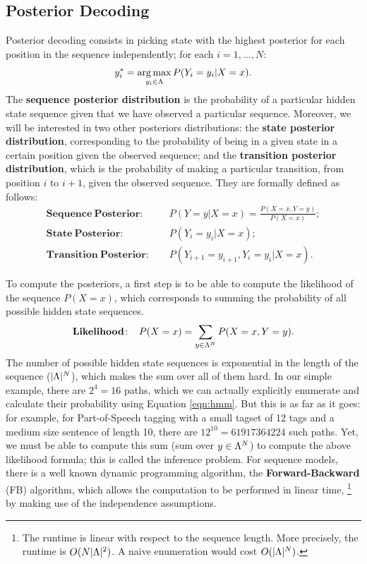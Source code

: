 \subsection{Posterior Decoding}\label{posterior}
Posterior decoding consists
in picking state with the highest posterior for each position in the sequence independently; for 
each $i = 1,\ldots,N$:
\begin{equation}
y_i^* = \operatorname*{arg\,max}_{y_i \in \Lambda} P(Y_i=y_i | X = x).
\end{equation}
The \textbf{sequence posterior distribution} is the probability of a particular
hidden state sequence given that we have observed a particular
sequence. Moreover, we will be interested in two other posteriors distributions:
the \textbf{state posterior distribution}, corresponding to the
probability of being in a given state in a certain position given the
observed sequence; and the \textbf{transition posterior distribution},
which is the probability of making a particular transition, from position $i$ to
$i+1$, given the observed sequence. They are formally defined as follows:
\begin{align}
  \mathbf{Sequence \ Posterior\!:}\;\;\;\; &P(Y=y|X=x) = \frac{P(X=x,Y=y)}{P(X=x)}; \label{eq::posteriorDistribution} \\
 \mathbf{State \ Posterior\!:}\;\;\;\;  & P(Y_i=y_i | X=x); \label{eq::nodePosterior} \\
 \mathbf{Transition \ Posterior\!:}\;\;\;\;  &P(Y_{i+1}=y_{i+1},Y_i=y_i| X=x).\label{eq::edgePosterior}
\end{align}

To compute the posteriors, a first step is to be able to compute the 
likelihood of
the sequence $P(X=x)$, which corresponds to summing the probability of all
possible hidden state sequences.
\begin{equation}
\label{likelihoood}
\mathbf{Likelihood\!:}\;\;\;\; P(X=x) = \displaystyle \sum_{y \in \Lambda^N} P(X=x,Y=y).
\end{equation}
The number of possible hidden state sequences is exponential in the
length of the sequence ($|\Lambda|^N$),
 which makes the sum over all of them hard. 
 In our simple
 example, there are $2^4 = 16$ paths, which we can actually explicitly enumerate
 and calculate their probability using Equation \ref{eqn:hmm}. But this is as far as it goes: for example, for Part-of-Speech
 tagging with a small tagset of 12 tags and a medium size
 sentence of length 10, there are $12^{10} = 61 917 364 224$ such
 paths. 
Yet, we must be able to compute this sum (sum over $y \in \Lambda^N$) to compute the above likelihood
formula; this is called the inference problem. For sequence models, there is a well known dynamic programming algorithm,
the \textbf{Forward-Backward} (FB) algorithm, which allows the computation
to be performed in linear time,%
\footnote{The runtime is linear with respect
to the sequence length. More precisely, 
the runtime is $O(N|\Lambda|^2)$. 
A naive enumeration would cost $O(|\Lambda|^N)$.} %
by making use of the independence assumptions.

